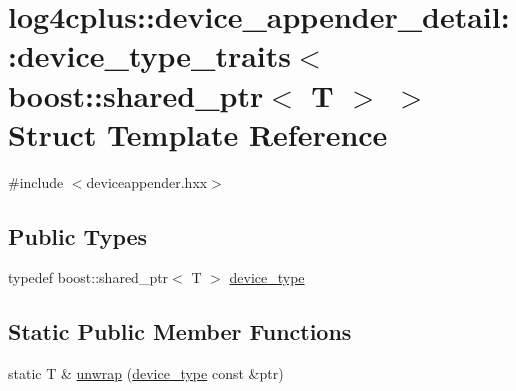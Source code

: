 \hypertarget{structlog4cplus_1_1device__appender__detail_1_1device__type__traits_3_01boost_1_1shared__ptr_3_01T_01_4_01_4}{\section{log4cplus\-:\-:device\-\_\-appender\-\_\-detail\-:\-:device\-\_\-type\-\_\-traits$<$ boost\-:\-:shared\-\_\-ptr$<$ T $>$ $>$ Struct Template Reference}
\label{structlog4cplus_1_1device__appender__detail_1_1device__type__traits_3_01boost_1_1shared__ptr_3_01T_01_4_01_4}
}


{\ttfamily \#include $<$deviceappender.\-hxx$>$}

\subsection*{Public Types}
\begin{DoxyCompactItemize}
\item 
typedef boost\-::shared\-\_\-ptr$<$ T $>$ \hyperlink{structlog4cplus_1_1device__appender__detail_1_1device__type__traits_3_01boost_1_1shared__ptr_3_01T_01_4_01_4_a41f46a979cd499527581edd3cf2c1f98}{device\-\_\-type}
\end{DoxyCompactItemize}
\subsection*{Static Public Member Functions}
\begin{DoxyCompactItemize}
\item 
static T \& \hyperlink{structlog4cplus_1_1device__appender__detail_1_1device__type__traits_3_01boost_1_1shared__ptr_3_01T_01_4_01_4_abd7b274cd839584a58c9d66891dc917f}{unwrap} (\hyperlink{structlog4cplus_1_1device__appender__detail_1_1device__type__traits_3_01boost_1_1shared__ptr_3_01T_01_4_01_4_a41f46a979cd499527581edd3cf2c1f98}{device\-\_\-type} const \&ptr)
\end{DoxyCompactItemize}


